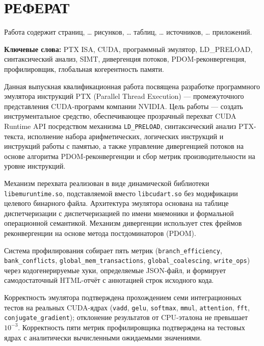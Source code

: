 \section*{РЕФЕРАТ}

Работа содержит \pageref{lastpage} страниц, \ldots{} рисунков, \ldots{} таблиц,
\ldots{} источников, \ldots{} приложений.

\textbf{Ключевые слова:} PTX ISA, CUDA, программный эмулятор,
LD\_PRELOAD, синтаксический анализ, SIMT, дивергенция потоков, PDOM-реконвергенция,
профилировщик, глобальная когерентность памяти.

Данная выпускная квалификационная работа посвящена разработке программного
эмулятора инструкций PTX (Parallel Thread Execution) --- промежуточного
представления CUDA-программ компании NVIDIA. Цель работы — создать инструментальное средство, обеспечивающее прозрачный перехват CUDA Runtime
API посредством механизма \texttt{LD\_PRELOAD}, синтаксический анализ PTX-текста,
исполнение набора арифметических, логических инструкций и инструкций работы
с памятью, а также управление дивергенцией потоков на основе алгоритма
PDOM-реконвергенции и сбор метрик производительности на уровне инструкций.

Механизм перехвата реализован в виде динамической библиотеки
\texttt{libemuruntime.so}, подставляемой вместо \texttt{libcudart.so}
без модификации целевого бинарного файла. Архитектура эмулятора
основана на таблице диспетчеризации с диспетчеризацией по имени мнемоники
и формальной операционной семантикой. Механизм дивергенции использует стек фреймов
реконвергенции на основе метода постдоминаторов (PDOM).

Система профилирования собирает пять метрик (\texttt{branch\_efficiency},
\texttt{bank\_conflicts}, \texttt{global\_mem\_transactions},
\texttt{global\_coalescing}, \texttt{write\_ops}) через кодогенерируемые хуки, определяемые
JSON-файл, и формирует самодостаточный HTML-отчёт с аннотацией
строк исходного кода.

Корректность эмулятора подтверждена прохождением семи интеграционных
тестов на реальных CUDA-ядрах (\texttt{vadd}, \texttt{gelu},
\texttt{softmax}, \texttt{mmul}, \texttt{attention}, \texttt{fft},
\texttt{conjugate\_gradient}); отклонение результатов от CPU-эталона
не превышает $10^{-3}$. Корректность пяти метрик профилировщика подтверждена на тестовых ядрах с аналитически вычисленными ожидаемыми значениями.

\newpage
